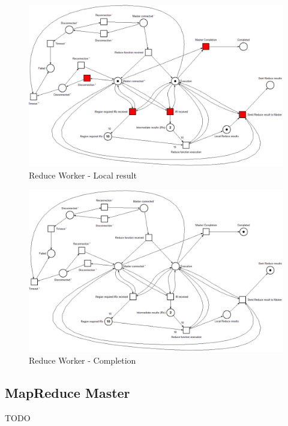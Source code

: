 \begin{figure}[!ht]
    \centering
    \includegraphics[width=\linewidth]{document/chapters/chapter_6/images/reduce_worker_petri_net_1.png}
    \caption{Reduce Worker - Local result}
    \label{fig:map_worker_petri_net_1}
\end{figure}

\begin{figure}[!ht]
    \centering
    \includegraphics[width=\linewidth]{document/chapters/chapter_6/images/reduce_worker_petri_net_2.png}
    \caption{Reduce Worker - Completion}
    \label{fig:map_worker_petri_net_2}
\end{figure}

\subsection{MapReduce Master}
TODO

